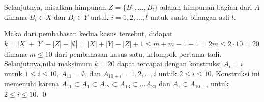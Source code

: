 \documentclass[12pt]{scrartcl}
\begin{document}
\begin{soalbaru}
\begin{solusi}
		Selanjutnya, misalkan himpunan $Z =\{B_1,\dots,B_l\}$ adalah himpunan bagian dari $A$ dimana $B_i \in X$ dan $B_i \in Y$ untuk $i=1,2,\dots,l$ untuk suatu bilangan asli $l$.
		
		Maka dari pembahasan kedua kasus tersebut, didapat $k=|X|+|Y|-|Z|+|{\emptyset}| = |X|+|Y|-|Z|+1 \le m + m -1+1 = 2m \le 2 \cdot 10 = 20$ dimana $m\le10$ dari pembahasan kasus satu, kelompok pertama tadi. Selanjutnya,nilai maksimum $k=20$ dapat tercapai dengan konstruksi $A_i = i$ untuk $1 \le i \le 10$, $A_{11}=\emptyset$, dan $A_{10+i} = {1,2,\dots,i}$ untuk $2 \le i \le 10$. Konstruksi ini memenuhi karena $A_{11}\subset A_1 \subset A_{12} \subset A_{13} \subset \dots A_{20}$ dan $A_i \subset A_{10+i}$ untuk $2 \le i \le 10$. \qed 
		\end{solusi}
	\end{soalbaru}
	\vspace{10pt}
	
\end{document}
